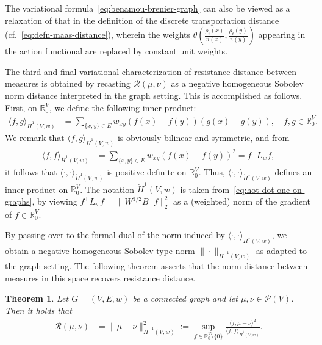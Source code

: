 \documentclass[11pt,a4paper]{article}
\newcommand{\Resis}{\mathcal{R}}
\newcommand{\Prob}{\mathscr{P}}
\newtheorem{theorem}{Theorem}[section]
\begin{document}
The variational formula~\cref{eq:benamou-brenier-graph} can also be viewed as a relaxation of that in the definition of the discrete transportation distance (cf.~\cref{eq:defn-maas-distance}), wherein the weights $\theta\left(\frac{\rho_t(x)}{\pi(x)}, \frac{\rho_t(y)}{\pi(y)}\right)$ appearing in the action functional are replaced by constant unit weights.

The third and final variational characterization of resistance distance between measures is obtained by recasting $\Resis(\mu,\nu)$ as a negative homogeneous Sobolev norm distance interpreted in the graph setting. This is accomplished as follows. First, on $\mathbb{R}^{V}_0$, we define the following inner product:
    \begin{align*}
        \langle f, g \rangle_{\dot{H}^{1}(V,w)} &= \sum_{\{x,y\}\in E} w_{xy} (f(x) - f(y))(g(x) - g(y)),\quad f,g\in\mathbb{R}^{V}_0.
    \end{align*}
We remark that $\langle f, g \rangle_{\dot{H}^{1}(V,w)}$ is obviously bilinear and symmetric, and from
    \begin{align}\label{eq:hot-dot-one-on-graphs}
        \langle f, f \rangle_{\dot{H}^{1}(V,w)} &= \sum_{\{x,y\}\in E} w_{xy} (f(x) - f(y))^2 = f^\top L_w f,
    \end{align}
it follows that $\langle \cdot, \cdot \rangle_{\dot{H}^{1}(V,w)}$ is positive definite on $\mathbb{R}^{V}_0$. Thus, $\langle \cdot, \cdot \rangle_{\dot{H}^{1}(V,w)}$ defines an inner product on $\mathbb{R}^{V}_0$. The notation $\dot{H}^{1}(V,w)$ is taken from~\cref{eq:hot-dot-one-on-graphs}, by viewing $f^\top L_w f = \|W^{1/2}B^\top f\|_2^2$ as a (weighted) norm of the gradient of $f\in\mathbb{R}^{V}_0$.

By passing over to the formal dual of the norm induced by $\langle \cdot, \cdot \rangle_{\dot{H}^{1}(V,w)}$, we obtain a negative homogeneous Sobolev-type norm $\|\cdot\|_{\dot{H}^{-1}(V,w)}$ as adapted to the graph setting. The following theorem asserts that the norm distance between measures in this space recovers resistance distance.

\begin{theorem}\label{thm:sobolev-characterization}
    Let $G=(V,E,w)$ be a connected graph and let $\mu,\nu\in\Prob(V)$. Then it holds that
        \begin{align*}
            \Resis(\mu,\nu) &= \|\mu - \nu\|_{\dot{H}^{-1}(V,w)}^2 := \sup_{f\in\mathbb{R}^{V}_0\setminus\{0\}} \frac{\langle f, \mu - \nu \rangle^2}{\langle f, f \rangle_{\dot{H}^{1}(V,w)}}.
        \end{align*}
\end{theorem}
\end{document}
